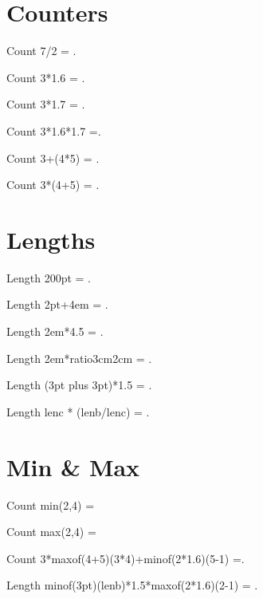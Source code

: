 \documentclass{article}
\begin{document}
\section{Counters}


\setcounter{ctra}{7/2}
Count 7/2 = \thectra.

Count 3*1.6 = \thectra.

Count 3*1.7 = \thectra.

Count 3*1.6*1.7  =\thectra.

\setcounter{ctra}{3+(4*5)}
Count 3+(4*5) = \thectra.

\setcounter{ctra}{3*(4+5)}
Count 3*(4+5) = \thectra.

\section{Lengths}
\newlength{\lena}
\newlength{\lenb}
\newlength{\lenc}
\setlength{\lena}{0pt}
\setlength{\lenb}{300pt}
\setlength{\lenc}{200pt}

\setlength{\lena}{200pt}
Length 200pt = \the\lena.

\setlength{\lena}{2pt+4em}
Length 2pt+4em = \the\lena.

Length 2em*4.5 = \the\lena.

\setlength{\lena}{2em*\ratio{3cm}{2cm}}
Length 2em*ratio{3cm}{2cm} = \the\lena.

Length (3pt plus 3pt)*1.5 = \the\lena.


\setlength{\lena}{\lenc*\ratio{\lenb}{\lenc}}
Length lenc * (lenb/lenc) = \the\lena.

\section{Min \& Max}
Count min(2,4) = \thectra

Count max(2,4) = \thectra

Count 3*maxof(4+5)(3*4)+minof(2*1.6)(5-1) =\thectra.

Length minof(3pt)(lenb)*1.5*maxof(2*1.6)(2-1) = \the\lena.
\end{document}
